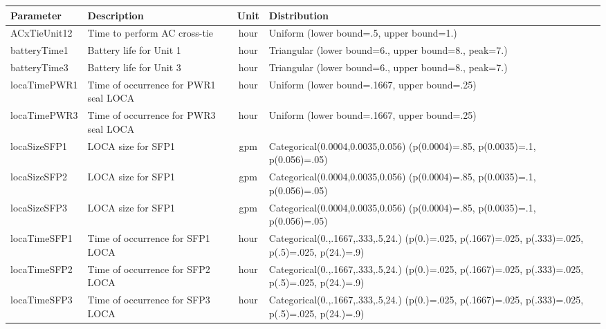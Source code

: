 \begin{table}
  \centering
  \begin{center}
      \begin{tabular}{ | l | p{5cm} | c | p{5cm} |}
        \hline
         Parameter          & Description                      & Unit      & Distribution                                         \\ \hline \hline
         ACxTieUnit12       & Time to perform AC cross-tie     & hour      & Uniform (lower bound=.5, upper bound=1.)             \\ \hline
         batteryTime1       & Battery life for Unit 1          & hour      & Triangular (lower bound=6., upper bound=8., peak=7.) \\ \hline
         batteryTime3       & Battery life for Unit 3          & hour      & Triangular (lower bound=6., upper bound=8., peak=7.) \\ \hline
         locaTimePWR1       & Time of occurrence for PWR1 seal LOCA & hour & Uniform (lower bound=.1667, upper bound=.25)         \\ \hline
         locaTimePWR3       & Time of occurrence for PWR3 seal LOCA & hour & Uniform (lower bound=.1667, upper bound=.25)         \\ \hline
         locaSizeSFP1       & LOCA size for SFP1               & gpm       & Categorical(0.0004,0.0035,0.056) (p(0.0004)=.85, p(0.0035)=.1, p(0.056)=.05)   \\ \hline
         locaSizeSFP2       & LOCA size for SFP1               & gpm       & Categorical(0.0004,0.0035,0.056) (p(0.0004)=.85, p(0.0035)=.1, p(0.056)=.05)   \\ \hline
         locaSizeSFP3       & LOCA size for SFP1               & gpm       & Categorical(0.0004,0.0035,0.056) (p(0.0004)=.85, p(0.0035)=.1, p(0.056)=.05)   \\ \hline    
         locaTimeSFP1       & Time of occurrence for SFP1 LOCA & hour      & Categorical(0.,.1667,.333,.5,24.) (p(0.)=.025, p(.1667)=.025, p(.333)=.025, p(.5)=.025, p(24.)=.9)  \\ \hline
         locaTimeSFP2       & Time of occurrence for SFP2 LOCA & hour      & Categorical(0.,.1667,.333,.5,24.) (p(0.)=.025, p(.1667)=.025, p(.333)=.025, p(.5)=.025, p(24.)=.9)  \\ \hline
         locaTimeSFP3       & Time of occurrence for SFP3 LOCA & hour      & Categorical(0.,.1667,.333,.5,24.) (p(0.)=.025, p(.1667)=.025, p(.333)=.025, p(.5)=.025, p(24.)=.9)  \\ \hline

\end{tabular}
\end{center}
\end{table}
